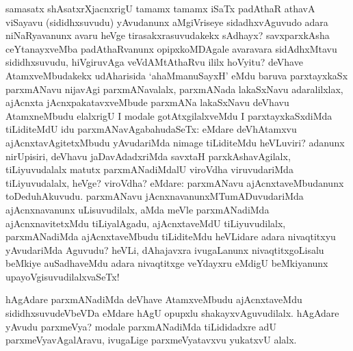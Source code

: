 
\begin{artha}
samasatx shAsatxrXjacnxrigU tamamx tamamx iSaTx padAthaR athavA viSayavu (sididhxsuvudu) yAvudanunx aMgiVriseye sidadhxvAguvudo adara niNaRyavanunx avaru heVge tirasakxrasuvudakekx sAdhayx? savxparxkAsha ceYtanayxveMba padAthaRvanunx opipxkoMDAgale avaravara sidAdhxMtavu sididhxsuvudu, hiVgiruvAga veVdAMtAthaRvu ililx hoVyitu? deVhave AtamxveMbudakekx udAharisida `ahaMmanuSayxH' eMdu baruva parxtayxkaSx parxmANavu nijavAgi parxmANavalalx, parxmANada lakaSxNavu adaralilxlax, ajAcnxta jAcnxpakatavxveMbude parxmANa lakaSxNavu deVhavu AtamxneMbudu elalxrigU I modale gotAtxgilalxveMdu I parxtayxkaSxdiMda tiLiditeMdU idu parxmANavAgabahudaSeTx: eMdare deVhAtamxvu ajAcnxtavAgitetxMbudu yAvudariMda nimage tiLiditeMdu heVLuviri? adanunx nirUpisiri, deVhavu jaDavAdadxriMda savxtaH parxkAshavAgilalx, tiLiyuvudalalx matutx parxmANadiMdalU viroVdha viruvudariMda tiLiyuvudalalx, heVge? viroVdha? eMdare: parxmANavu ajAcnxtaveMbudanunx toDeduhAkuvudu. parxmANavu jAcnxnavanunxMTumADuvudariMda ajAcnxnavanunx uLisuvudilalx, aMda meVle parxmANadiMda ajAcnxnavitetxMdu tiLiyalAgadu, ajAcnxtaveMdU tiLiyuvudilalx, parxmANadiMda ajAcnxtaveMbudu tiLiditeMdu heVLidare adara nivaqtitxyu yAvudariMda Aguvudu? heVLi, dAhajavxra ivugaLanunx nivaqtitxgoLisalu beMkiye auSadhaveMdu adara nivaqtitxge veYdayxru eMdigU beMkiyanunx upayoVgisuvudilalxvaSeTx!
\end{artha}

\begin{artha}
hAgAdare parxmANadiMda deVhave AtamxveMbudu ajAcnxtaveMdu sididhxsuvudeVbeVDa eMdare hAgU opupxlu shakayxvAguvudilalx. hAgAdare yAvudu parxmeVya? modale parxmANadiMda tiLididadxre adU parxmeVyavAgalAravu, ivugaLige parxmeVyatavxvu yukatxvU alalx.
\end{artha}

